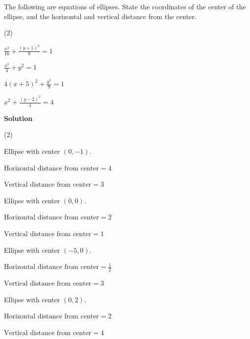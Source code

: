 \documentclass[11pt,a4paper]{book}
\begin{document}
\begin{example}{}
The following are equations of ellipses. State the coordinates of
the center of the ellipse, and the horizontal and vertical distance
from the center.

\begin{tasks}[label=(\alph*),label-width=3.5ex](2)

\task  ${\displaystyle \frac{x^{2}}{16}+\frac{\left(y+1\right)^{2}}{9}=1}$

\task  ${\displaystyle \frac{x^{2}}{4}+y^{2}=1}$

\task  ${\displaystyle 4\left(x+5\right)^{2}+\frac{y^{2}}{9}=1}$

\task  ${\displaystyle x^{2}+\frac{\left(y-2\right)^{2}}{4}=4}$

\end{tasks}

\textbf{Solution}

\begin{tasks}[label=(\alph*),label-width=3.5ex](2)

\task  Ellipse with center $\left(0,-1\right)$.

$\text{Horizontal distance from center}=4$

$\text{Vertical distance from center}=3$

\task  Ellipse with center $\left(0,0\right)$.

$\text{Horizontal distance from center}=2$

$\text{Vertical distance from center}=1$

\task  Ellipse with center $\left(-5,0\right)$.

${\displaystyle \text{Horizontal distance from center}=\frac{1}{2}}$

$\text{Vertical distance from center}=3$

\task Ellipse with center $\left(0,2\right)$.

$\text{Horizontal distance from center}=2$

$\text{Vertical distance from center}=4$

\end{tasks}
\end{example}

\newpage
\end{document}
